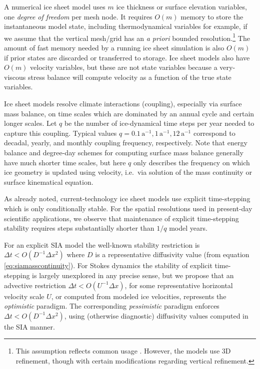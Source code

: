 \documentclass[twocolumn,letterpaper]{igs}
\begin{document}
A numerical ice sheet model uses $m$ ice thickness or surface elevation variables, one \emph{degree of freedom} per mesh node.  It requires $O(m)$ memory to store the instantaneous model state, including thermodynamical variables for example, if we assume that the vertical mesh/grid has an \emph{a priori} bounded resolution.\footnote{This assumption reflects common usage \citep[for example]{Aschwandenetal2019,Brinkerhoffetal2017,Hoffmanetal2018,Lengetal2012}.  However, the \cite{BrownSmithAhmadia2013,IsaacStadlerGhattas2015} models use 3D refinement, though with certain modifications regarding vertical refinement.}  The amount of fast memory needed by a running ice sheet simulation is also $O(m)$ if prior states are discarded or transferred to storage.  Ice sheet models also have $O(m)$ velocity variables, but these are not state variables because a very-viscous stress balance will compute velocity as a function of the true state variables.
 
Ice sheet models resolve climate interactions (coupling), especially via surface mass balance, on time scales which are dominated by an annual cycle and certain longer scales.  Let $q$ be the number of ice-dynamical time steps per year needed to capture this coupling.  Typical values $q=0.1 \,\text{a}^{-1}, 1 \,\text{a}^{-1}, 12 \,\text{a}^{-1}$ correspond to decadal, yearly, and monthly coupling frequency, respectively.  Note that energy balance and degree-day schemes for computing surface mass balance generally have much shorter time scales, but here $q$ only describes the frequency on which ice geometry is updated using velocity, i.e.~via solution of the mass continuity or surface kinematical equation.

As already noted, current-technology ice sheet models use explicit time-stepping which is only conditionally stable.  For the spatial resolutions used in present-day scientific applications, we observe that maintenance of explicit time-stepping stability requires steps substantially shorter than $1/q$ model years.

For an explicit SIA model the well-known stability restriction is $\Delta t < O(D^{-1} \Delta x^2)$ \citep{Bueleretal2005,HindmarshPayne1996} where $D$ is a representative diffusivity value (from equation \eqref{eq:siamasscontinuity}).  For Stokes dynamics the stability of explicit time-stepping is largely unexplored in any precise sense, but we propose that an advective restriction $\Delta t < O(U^{-1} \Delta x)$, for some representative horizontal velocity scale $U$, or computed from modeled ice velocities, represents the \emph{optimistic} paradigm.  The corresponding \emph{pessimistic} paradigm enforces $\Delta t < O(D^{-1} \Delta x^2)$, using (otherwise diagnostic) diffusivity values computed in the SIA manner.
\end{document}
